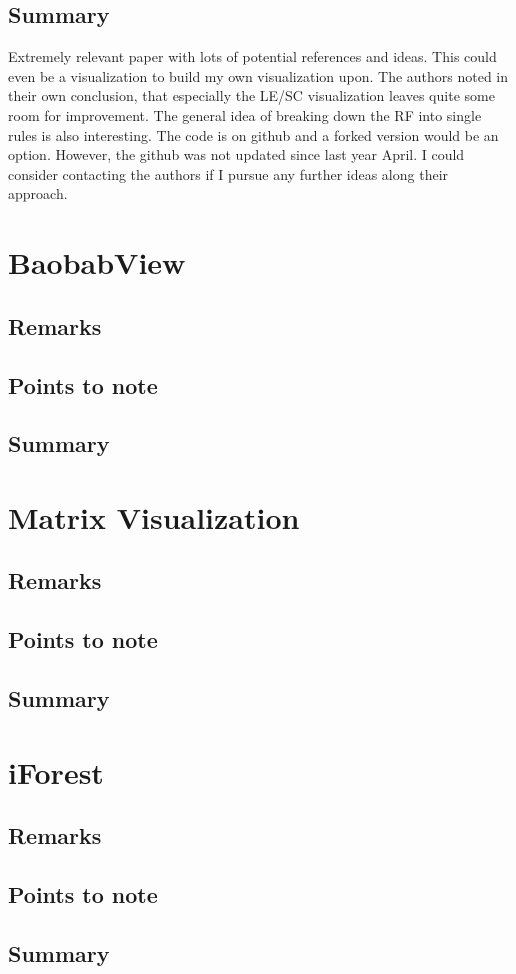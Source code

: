 \documentclass[a4paper, 12pt]{article}
\begin{document}
\subsection{Summary}
Extremely relevant paper with lots of potential references and ideas. This could even be a visualization to build
my own visualization upon. The authors noted in their own conclusion, that especially the LE/SC visualization
leaves quite some room for improvement. The general idea of breaking down the RF into single rules is also
interesting. The code is on github and a forked version would be an option. However, the github was not updated
since last year April. I could consider contacting the authors if I pursue any further ideas along their approach.

\section{BaobabView}
\cite{van2011baobabview}
\subsection{Remarks}
\subsection{Points to note}
\subsection{Summary}

\section{Matrix Visualization}
\cite{ming2018rulematrix}

\subsection{Remarks}
\subsection{Points to note}
\subsection{Summary}

\section{iForest}
\cite{zhao2018iforest}

\subsection{Remarks}
\subsection{Points to note}
\subsection{Summary}

\clearpage


\end{document}
